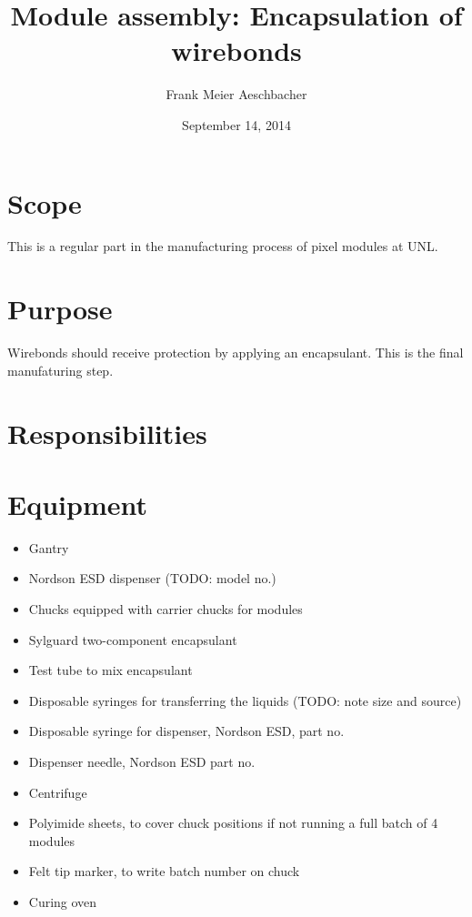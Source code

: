 \documentclass[12pt]{unlsilabsop}
\title{Module assembly: Encapsulation of wirebonds}
\date{September 14, 2014}
\author{Frank Meier Aeschbacher}
\begin{document}
\maketitle

\section{Scope}
This is a regular part in the manufacturing process of pixel modules at UNL.

\section{Purpose}
Wirebonds should receive protection by applying an encapsulant. This is the final manufaturing step.


\section{Responsibilities}

\section{Equipment}

\begin{itemize}
    \item Gantry
    \item Nordson ESD dispenser (TODO: model no.)
    \item Chucks equipped with carrier chucks for modules
    \item Sylguard two-component encapsulant
    \item Test tube to mix encapsulant
    \item Disposable syringes for transferring the liquids (TODO: note size and source)
    \item Disposable syringe for dispenser, Nordson ESD, part no.
    \item Dispenser needle, Nordson ESD part no.
    \item Centrifuge
    \item Polyimide sheets, to cover chuck positions if not running a full batch of 4 modules
    \item Felt tip marker, to write batch number on chuck
    \item Curing oven
\end{itemize}
\end{document}
